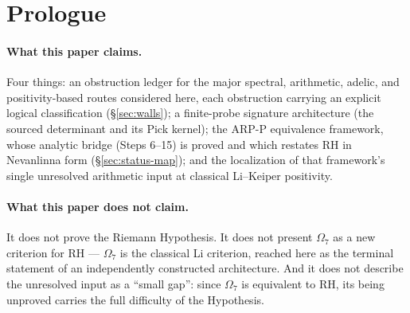 \documentclass[11pt]{amsart}
\theoremstyle{definition}
\theoremstyle{remark}
\theoremstyle{definition}
\begin{document}
\begin{abstract}
Inside $\Omega_7$, the direct arithmetic route is carried one step farther.  An unconditional
prime-number-theorem tail estimate (A0) and exact pole--prime--Gamma bookkeeping
reduce the whole forward implication to one compact signed inequality (A1): a single Chebyshev-discrepancy
integral against $e^{-u}L_{n-1}^{(2)}(u)$ with an explicit archimedean reserve of order
$\frac38n\log n$.  Every implication from A1 to Li positivity and hence to RH is proved; A1 itself
remains open.  A finite range of A1 is checked by interval arithmetic, partly conditionally on an
unproved coefficient-tail bound, and these numbers are not certified.  A1 implies $\lambda_n>0$ for all $n$, so it is at least as strong as RH, and the strengthened sufficient forms are at least as strong as the classical Li criterion.  This refinement reformulates the terminal inequality; it does not prove it.
\end{abstract}

\tableofcontents
\newpage

\section{Prologue}\label{sec:prologue}

\paragraph{What this paper claims.}  Four things: an obstruction ledger for the major spectral,
arithmetic, adelic, and positivity-based routes considered here, each obstruction carrying an
explicit logical classification (\S\ref{sec:walls}); a finite-probe signature architecture (the sourced
determinant and its Pick kernel); the ARP-P equivalence framework, whose analytic bridge (Steps 6--15) is proved and which restates RH in Nevanlinna form
(\S\ref{sec:status-map}); and the localization of that framework's single unresolved arithmetic input at
classical Li--Keiper positivity.

\paragraph{What this paper does not claim.}  It does not prove the Riemann Hypothesis.  It does not
present $\Omega_7$ as a new criterion for RH --- $\Omega_7$ is the classical Li criterion, reached here as
the terminal statement of an independently constructed architecture.  And it does not describe the
unresolved input as a ``small gap'': since $\Omega_7$ is equivalent to RH, its being unproved carries
the full difficulty of the Hypothesis.
\end{document}
